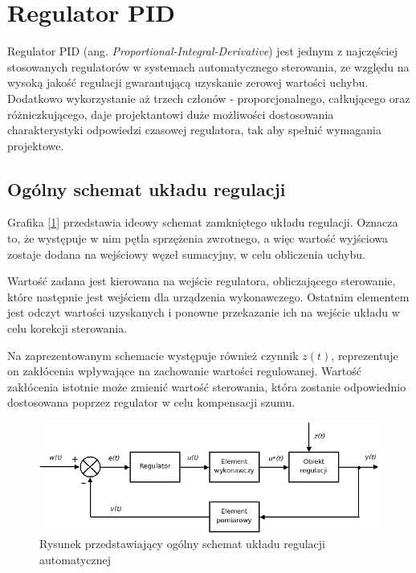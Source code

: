 \clearpage

\section{Regulator PID}

Regulator PID (ang. \textit{Proportional-Integral-Derivative}) jest jednym z najczęściej stosowanych regulatorów w systemach automatycznego sterowania, ze względu na wysoką jakość regulacji gwarantującą uzyskanie zerowej wartości uchybu. Dodatkowo wykorzystanie aż trzech członów - proporcjonalnego, całkującego oraz różniczkującego, daje projektantowi duże możliwości dostosowania charakterystyki odpowiedzi czasowej regulatora, tak aby spełnić wymagania projektowe. 

\subsection{Ogólny schemat układu regulacji}

Grafika [\ref{rys2:regulacja1}] przedstawia ideowy schemat zamkniętego układu regulacji. Oznacza to, że występuje w nim pętla sprzężenia zwrotnego, a więc wartość wyjściowa zostaje dodana na wejściowy węzeł sumacyjny, w celu obliczenia uchybu. 

Wartość zadana jest kierowana na wejście regulatora, obliczającego sterowanie, które następnie jest wejściem dla urządzenia wykonawczego. Ostatnim elementem jest odczyt wartości uzyskanych i ponowne przekazanie ich na wejście układu w celu korekcji sterowania.

Na zaprezentowanym schemacie występuje również czynnik \(z(t)\), reprezentuje on zakłócenia wpływające na zachowanie wartości regulowanej. Wartość zakłócenia istotnie może zmienić wartość sterowania, która zostanie odpowiednio dostosowana poprzez regulator w celu kompensacji szumu. 

\begin{figure}[h]
    \centering
    \includegraphics[width=1.0\textwidth]{./graf/regulacja1.png}
    \caption{Rysunek przedstawiający ogólny schemat układu regulacji automatycznej \cite{bib:wiki-regulacja}}
    \label{rys2:regulacja1}
\end{figure}

